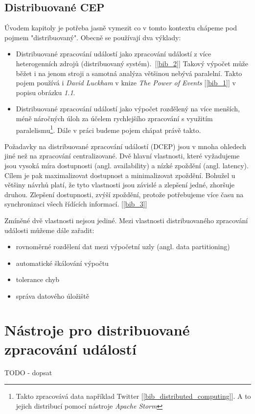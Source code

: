 \documentclass[
  digital, %
  table,   %
  nolof,     %
  nolot,     %
  oneside, %
  nocover,
  monochrome,
  12pt
]{fithesis3}
\begin{document}
\section{Distribuované CEP}
Úvodem kapitoly je potřeba jasně vymezit co v tomto kontextu chápeme pod pojmem "distribuovaný". Obecně se používají dva výklady:
\begin{itemize}
  \item Distribuované zpracování událostí jako zpracování událostí z více heterogenních zdrojů (distribuovaný systém).~[\ref{bib_2}] Takový výpočet může běžet i na jenom stroji a samotná analýza většinou nebývá paralelní. Takto pojem používá i \textit{David Luckham} v knize \textit{The Power of Events} [\ref{bib_1}] v popisu obrázku \textit{1.1}.
  \item Distribuované zpracování událostí jako výpočet rozdělený na více menších, méně náročných úloh za účelem rychlejšího zpracování s využitím paralelismu\footnote{Takto zpracovává data například Twitter [\ref{bib_distributed_computing}]. A to jejich distribucí pomocí nástroje \textit{Apache Storm}}. Dále v práci budeme pojem chápat právě takto.
\end{itemize}

Požadavky na distribuované zpracování událostí (DCEP) jsou v mnoha ohledech jiné než na zpracování centralizované. Dvě hlavní vlastnosti, které vyžadujeme jsou vysoká míra dostupnosti (angl. availability) a nízké zpoždění (angl. latency). Cílem je pak maximalizovat dostupnost a minimalizovat zpoždění. Bohužel u většiny návrhů platí, že tyto vlastnosti jsou závislé a zlepšení jedné, zhoršuje druhou. Zlepšení dostupnosti, zvýší zpoždění, protože potřebujeme více času na synchronizaci všech řídících informací. [\ref{bib_3}]

Zmíněné dvě vlastnosti nejsou jediné. Mezi vlastnosti distribuovaného zpracování události můžeme dále zařadit:
\begin{itemize}
  \item rovnoměrné rozdělení dat mezi výpočetní uzly (angl. data partitioning)
  \item automatické škálování výpočtu
  \item tolerance chyb
  \item správa datového úložiště
\end{itemize}

\chapter{Nástroje pro distribuované zpracování událostí}
TODO - dopsat
\end{document}
